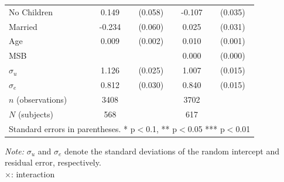 \documentclass[12pt]{article}
\begin{document}
{\begin{table}[H]
{\begin{tabular}{l*{2}{cc}}
No Children  &       0.149\sym{**} &     (0.058)&      -0.107\sym{***}&     (0.035)\\
Married&      -0.234\sym{***}&     (0.060)&       0.025         &     (0.031)\\
Age         &       0.009\sym{***}&     (0.002)&       0.010\sym{***}&     (0.001)\\
MSB      &                     &            &       0.000         &     (0.000)\\
$\sigma_u $    &       1.126\sym{***}&     (0.025)&       1.007\sym{***}&     (0.015)\\
$\sigma_e $    &       0.812\sym{***}&     (0.030)&       0.840\sym{***}&     (0.015)\\
\hline
\(n\) (observations)      &        3408         &            &        3702         &            \\
\(N\) (subjects)      &        568         &            &        617         &            \\
\hline\hline
\multicolumn{5}{l}{\footnotesize Standard errors in parentheses. * p$<$0.1, ** p$<$0.05 *** p$<$0.01}\\
\end{tabular}
}



\begin{tablenotes}
            \footnotesize
          
            \item \textit{Note:} $\sigma_u$ and $\sigma_e$ denote the standard deviations of the random intercept and residual error, respectively.\\
            $\times$: interaction\\
        \end{tablenotes}
\end{table}





\clearpage






\clearpage


}
\end{document}
